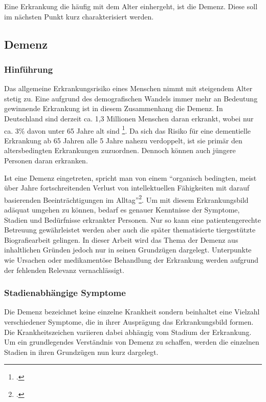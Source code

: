 Eine Erkrankung die häufig mit dem Alter einhergeht, ist die Demenz. Diese soll im nächsten Punkt kurz charakterisiert werden.

\subsection{Demenz}
\label{sec:k2.2_Demenz}

\subsubsection{Hinführung}
\label{sec:k2.2.1_Hinfuehrung}

Das allgemeine Erkrankungsrisiko eines Menschen nimmt mit steigendem Alter stetig zu. Eine aufgrund des demografischen Wandels immer mehr an Bedeutung gewinnende Erkrankung ist in diesem Zusammenhang die Demenz. In Deutschland sind derzeit ca. 1,3 Millionen Menschen daran erkrankt, wobei nur ca. 3\% davon unter 65 Jahre alt sind \footcite[9]{Schwarz2009}. Da sich das Risiko für eine dementielle Erkrankung ab 65 Jahren alle 5 Jahre nahezu verdoppelt, ist sie primär den altersbedingten Erkrankungen zuzuordnen. Dennoch können auch jüngere Personen daran erkranken. 

Ist eine Demenz eingetreten, spricht man von einem "`organisch bedingten, meist über Jahre fortschreitenden Verlust von intellektuellen Fähigkeiten mit darauf basierenden Beeinträchtigungen im Alltag"'\footcite[11]{o.A.2013}. Um mit diesem Erkrankungsbild adäquat umgehen zu können, bedarf es genauer Kenntnisse der Symptome, Stadien und Bedürfnisse erkrankter Personen. Nur so kann eine patientengerechte Betreuung gewährleistet werden aber auch die später thematisierte tiergestützte Biografiearbeit gelingen. In dieser Arbeit wird das Thema der Demenz aus inhaltlichen Gründen jedoch nur in seinen Grundzügen dargelegt. Unterpunkte wie Ursachen oder medikamentöse Behandlung der Erkrankung werden aufgrund der fehlenden Relevanz vernachlässigt.

\subsubsection{Stadienabhängige Symptome}
\label{sec:k2.2.2_StadienabhängigeSymptome}

Die Demenz bezeichnet keine einzelne Krankheit sondern beinhaltet eine Vielzahl verschiedener Symptome, die in ihrer Ausprägung das Erkrankungsbild formen. Die Krankheitszeichen variieren dabei abhängig vom Stadium der Erkrankung. Um ein grundlegendes Verständnis von Demenz zu schaffen, werden die einzelnen Stadien in ihren Grundzügen nun kurz dargelegt.

